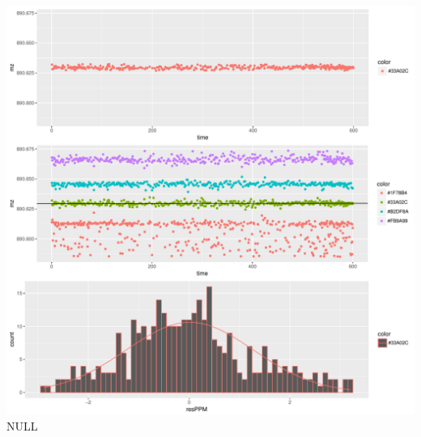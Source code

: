 \documentclass[]{article}
\begin{document}
\includegraphics{Supplementary_document_files/figure-latex/filter.lm.890-1.pdf}
NULL
\end{document}
